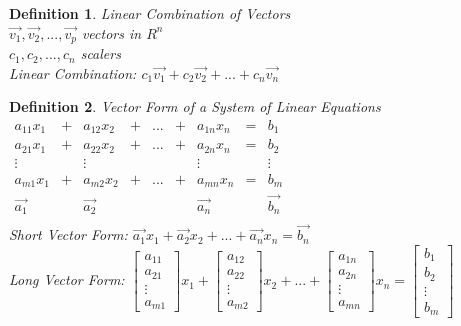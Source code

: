 \documentclass[a4paper,12pt,openany]{book}
\theoremstyle{defn}
\newtheorem{defn}{Definition}[section]
\theoremstyle{expl}
\begin{document}
\begin{defn}
\textup{
Linear Combination of Vectors\\
$\vec{v_1},\vec{v_2},...,\vec{v_p}$ vectors in $R^n$\\
$c_1,c_2,...,c_n$ scalers\\
Linear Combination: $c_1\vec{v_1}+c_2\vec{v_2}+...+c_n\vec{v_n}$
}\end{defn}

\begin{defn}
\textup{
Vector Form of a System of Linear Equations\\
$\begin{array}{ccccccccc}
a_{11}x_1&+&a_{12}x_2&+&...&+&a_{1n}x_n &=&b_1\\
a_{21}x_1&+&a_{22}x_2&+&...&+&a_{2n}x_n &=&b_2\\
\vdots&&\vdots&&&&\vdots&&\vdots\\
a_{m1}x_1&+&a_{m2}x_2&+&...&+&a_{mn}x_n&=& b_m\\
\vec{a_1}&&\vec{a_2}&&&&\vec{a_n}&&\vec{b_n}\\
\end{array}$\\
Short Vector Form: $\vec{a_1}x_1+\vec{a_2}x_2+...+\vec{a_n}x_n=\vec{b_n}$\\
Long Vector Form: $\left[\begin{array}{c} a_{11}\\a_{21}\\\vdots\\a_{m1}\end{array}\right]x_1
+\left[\begin{array}{c} a_{12}\\a_{22}\\\vdots\\a_{m2}\end{array}\right]x_2+...
+\left[\begin{array}{c} a_{1n}\\a_{2n}\\\vdots\\a_{mn}\end{array}\right]x_n
=\left[\begin{array}{c} b_{1}\\b_{2}\\\vdots\\b_{m}\end{array}\right]$
}\end{defn}
\end{document}
